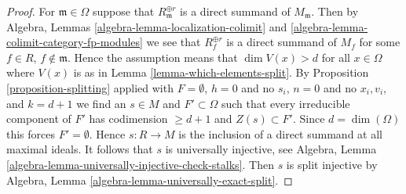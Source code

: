 \documentclass[10pt,a4paper]{amsart}
\theoremstyle{plain}
\theoremstyle{definition}
\theoremstyle{remark}
\numberwithin{equation}{subsection}
\begin{document}
\begin{proof}
For $\mathfrak m \in \Omega$ suppose that $R_\mathfrak m^{\oplus r}$
is a direct summand of $M_\mathfrak m$. Then by Algebra, Lemmas
\ref{algebra-lemma-localization-colimit} and
\ref{algebra-lemma-colimit-category-fp-modules}
we see that $R_f^{\oplus r}$ is a direct summand of $M_f$
for some $f \in R$, $f \not \in \mathfrak m$. Hence
the assumption means that $\dim V(x) > d$ for all $x \in \Omega$
where $V(x)$ is as in Lemma \ref{lemma-which-elements-split}.
By Proposition \ref{proposition-splitting} applied with $F = \emptyset$,
$h = 0$ and no $s_i$, $n = 0$ and no $x_i, v_i$, and $k = d + 1$
we find an $s \in M$ and $F' \subset \Omega$
such that every irreducible component of $F'$ has codimension $\geq d + 1$
and $Z(s) \subset F'$. Since $d = \dim(\Omega)$ this forces
$F' = \emptyset$. Hence $s : R \to M$ is the inclusion of a
direct summand at all maximal ideals. It follows that $s$ is universally
injective, see Algebra, Lemma
\ref{algebra-lemma-universally-injective-check-stalks}. Then
$s$ is split injective by
Algebra, Lemma \ref{algebra-lemma-universally-exact-split}.
\end{proof}
\end{document}
